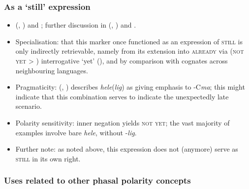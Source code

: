 \subsubsection{As a \lq{}still\rq{ }expression}
\begin{itemize}
	\item \citeauthor{Haspelmath1991} (\citeyear{Haspelmath1991}, \citeyear[145, 210]{Haspelmath1993}) and \textcite[102]{TalibovGadziev1966};  further discussion in \citeauthor{vanderAuwera1993} (\citeyear{vanderAuwera1993},  \citeyear{vanderAuwera1998})  and \textcite[195–197]{vanBaar1997}.
	\item Specialisation: that this marker once functioned as an expression of \textsc{still} is only indirectly retrievable, namely from its extension into \textsc{already} via (\textsc{not yet} > ) interrogative \lq yet\rq{ }(), and by comparison with cognates across neighbouring languages.
	\item Pragmaticity: \citeauthor{Haspelmath1991} (\citeyear{Haspelmath1991}, \citeyear[210]{Haspelmath1993}) describes \textit{hele}(\textit{lig}) as giving emphasis to \mbox{-C\textit{ma}}; this might indicate that this combination serves to indicate the unexpectedly late scenario.
	\item Polarity sensitivity: inner negation yields \textsc{not yet}; the vast majority of examples involve bare \textit{hele}, without \mbox{-\textit{lig}}.
	\item Further note: as noted above, this expression does not (anymore) serve as \textsc{still} in its own right.
\end{itemize}

\subsubsection{Uses related to other phasal polarity concepts}
